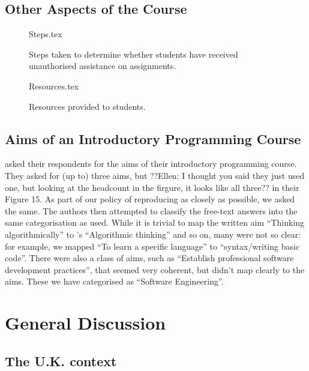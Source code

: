 \documentclass{sig-alternate}
\begin{document}
\subsection{Other Aspects of the Course}

\begin{figure}
\begin{center}
{Steps.tex}
\end{center}
\caption{Steps taken to determine whether students have received unauthorised assistance on assignments.}
\end{figure}

\begin{figure}
\begin{center}
{Resources.tex}
\end{center}
\caption{Resources provided to students.}
\end{figure}
\subsection{Aims of an Introductory Programming Course}
 \cite{mason+cooper:2014} asked their respondents for the aims of their introductory programming course. They asked for (up to) three aims, but ??Ellen: I thought you said they just used one, but looking at the headcount in the firgure, it looks like all three?? in their Figure 15. As part of our policy of reproducing  \cite{mason+cooper:2014} as closely as possible, we asked the same. The authors then attempted to classify the free-text answers into the same categorisation as  \cite{mason+cooper:2014} used. While it is trivial to map the written aim ``Thinking algorithmically'' to \cite{mason+cooper:2014}'s ``Algorithmic thinking'' and so on, many were not so clear: for example, we mapped ``To learn a specific language'' to ``syntax/writing basic code''. There were also a class of aims, such as ``Establish professional software development practices'', that seemed very coherent, but didn't map clearly to the \cite{mason+cooper:2014} aims. These we have categorised as ``Software Engineering''.

\section{General Discussion}\label{discussion}

\subsection{The U.K. context}
\end{document}

